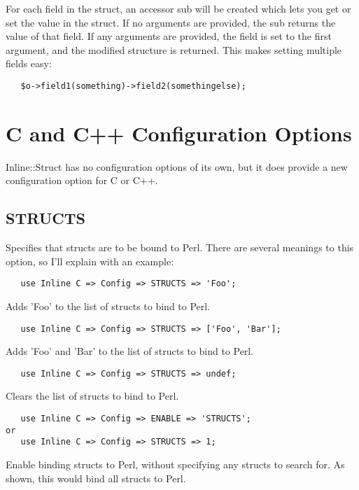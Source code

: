 \documentclass{article}
\begin{document}
For each field in the struct, an accessor sub will be created which lets you 
get or set the value in the struct. If no arguments are provided, the sub
returns the value of that field. If any arguments are provided, the field is
set to the first argument, and the modified structure is returned. This makes
setting multiple fields easy:

\begin{verbatim}
   $o->field1(something)->field2(somethingelse);
\end{verbatim}
\section{C and C++ Configuration Options\label{C_and_C_Configuration_Options}}


Inline::Struct has no configuration options of its own, but it does provide
a new configuration option for C or C++.

\subsection{STRUCTS\label{STRUCTS}}


Specifies that structs are to be bound to Perl. There are several meanings to
this option, so I'll explain with an example:

\begin{verbatim}
   use Inline C => Config => STRUCTS => 'Foo';
\end{verbatim}


Adds 'Foo' to the list of structs to bind to Perl.

\begin{verbatim}
   use Inline C => Config => STRUCTS => ['Foo', 'Bar'];
\end{verbatim}


Adds 'Foo' and 'Bar' to the list of structs to bind to Perl.

\begin{verbatim}
   use Inline C => Config => STRUCTS => undef;
\end{verbatim}


Clears the list of structs to bind to Perl.

\begin{verbatim}
   use Inline C => Config => ENABLE => 'STRUCTS';
or
   use Inline C => Config => STRUCTS => 1;
\end{verbatim}


Enable binding structs to Perl, without specifying any structs to search for. 
As shown, this would bind all structs to Perl.
\end{document}

